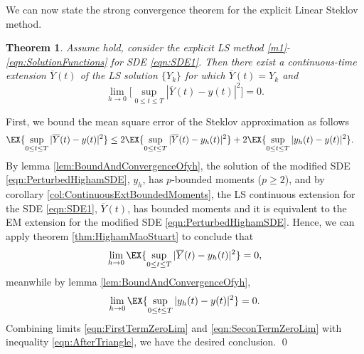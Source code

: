 \documentclass[sort&compress, preprint]{elsarticle}
\theoremstyle{definition}
\theoremstyle{plain}%
\newtheorem{thm}{Theorem}[section]
\theoremstyle{remark}
\newcommand{\SM}{LS\xspace}
\begin{document}
	We can now state  the strong convergence theorem  for the  explicit Linear Steklov method.%
\begin{thm}
	Assume  hold, consider the 
	explicit \SM method \eqref{m1}-\eqref{eqn:SolutionFunctions} for SDE \eqref{eqn:SDE1}.
	Then there exist a continuous-time extension $\overline{Y}(t)$ of the LS solution
	 $\{Y_k\}$ for which $\overline{Y}(t)=Y_k$ and
	\begin{equation*}
		\lim_{h\rightarrow0}\Big[\sup_{0\leq t\leq T} |\overline{Y}(t) - y(t)|^2\Big]=0.
	\end{equation*}
\end{thm}
\begin{pf}
	First, we bound  the mean square error of the Steklov approximation as follows
	\begin{align}\label{eqn:AfterTriangle}
		\EX{\sup_{0\leq t \leq T}|\overline{Y}(t) - y(t)|^2}
		&\leq
		2\EX{
			\sup_{0\leq t \leq T}
			|\overline{Y}(t) - y_h(t)|^2
		}
		+
		2\EX{
			\sup_{0\leq t \leq T}
			|y_h(t) - y(t)|^2
		}.
	\end{align}
	 By lemma \ref{lem:BoundAndConvergenceOfyh}, the solution of the modified SDE \eqref{eqn:PerturbedHighamSDE}, $y_h$, has
	$p$-bounded moments ($p\geq 2$), and by corollary \ref{col:ContinuousExtBoundedMoments}, 
	the \SM continuous extension for the SDE \eqref{eqn:SDE1}, $\overline{Y}(t)$, 
	has bounded moments and it is equivalent to the EM extension for the modified SDE 
	\eqref{eqn:PerturbedHighamSDE}. Hence, we can apply 
	theorem	\ref{thm:HighamMaoStuart} to conclude that
	\begin{equation}\label{eqn:FirstTermZeroLim}
		\lim_{h\to 0}
		\EX{
			\sup_{0\leq t \leq T}
			|\overline{Y}(t) - y_h(t)|^2
		} = 0,
	\end{equation}
	 meanwhile by lemma \ref{lem:BoundAndConvergenceOfyh},
	\begin{equation}\label{eqn:SeconTermZeroLim}
		\lim_{h\to 0}
		\EX{
			\sup_{0\leq t \leq T}
			|y_h(t) - y(t)|^2
		} = 0.
	\end{equation}
	Combining limits \eqref{eqn:FirstTermZeroLim} and \eqref{eqn:SeconTermZeroLim} with 
	inequality \eqref{eqn:AfterTriangle}, we have the desired conclusion. \qed
\end{pf}
%
\end{document}
